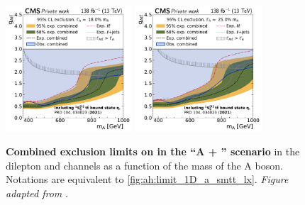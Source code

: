 \begin{figure}[!ph]
    \\
    \includegraphics[width=0.42\textwidth]{figures/ah/limits_combined/etat/A_limit_w18p0_g-scan.pdf}%
    \hspace*{0.05\textwidth}%
    \includegraphics[width=0.42\textwidth]{figures/ah/limits_combined/etat/A_limit_w25p0_g-scan.pdf}
    \caption{%
    \textbf{Combined exclusion limits on \gAtt in the ``A + \etat'' scenario} in the dilepton and \ljets channels as a function of the mass of the A boson. Notations are equivalent to \cref{fig:ah:limit_1D_a_smtt_lx}. \textit{Figure adapted from }.
    }
    \label{fig:ah:limit_1D_a_etat_lx}
\end{figure}
    
